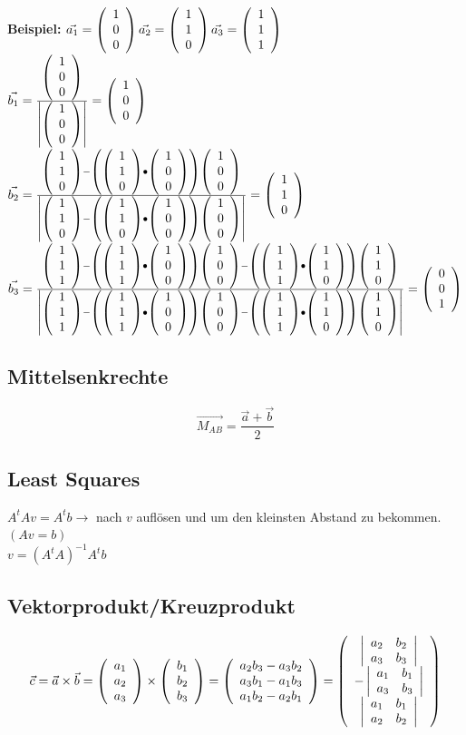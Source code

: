 	\textbf{Beispiel:} $\vec{a_1}=\vektor{1}{0}{0}
						\vec{a_2}=\vektor{1}{1}{0}
						\vec{a_3}=\vektor{1}{1}{1}$ \\
						
						$\vec{b_1}=\frac{\vektor{1}{0}{0}}{\left|\vektor{1}{0}{0}\right|}=\vektor{1}{0}{0}$ \\
						$\vec{b_2}=\frac{\vektor{1}{1}{0}-\left(\vektor{1}{1}{0}\bullet\vektor{1}{0}{0}\right)\vektor{1}{0}{0}}{\left|\vektor{1}{1}{0}-\left(\vektor{1}{1}{0}\bullet\vektor{1}{0}{0}\right)\vektor{1}{0}{0}\right|}=\vektor{1}{1}{0}$\\
						$\vec{b_3}=\frac{\vektor{1}{1}{1}-\left(\vektor{1}{1}{1}\bullet\vektor{1}{0}{0}\right)\vektor{1}{0}{0}-\left(\vektor{1}{1}{1}\bullet\vektor{1}{1}{0}\right)\vektor{1}{1}{0}}{\left|\vektor{1}{1}{1}-\left(\vektor{1}{1}{1}\bullet\vektor{1}{0}{0}\right)\vektor{1}{0}{0}-\left(\vektor{1}{1}{1}\bullet\vektor{1}{1}{0}\right)\vektor{1}{1}{0}\right|}=\vektor{0}{0}{1}$

\subsection{Mittelsenkrechte}
	\begin{equation*}
		\vec{M_{AB}} = \frac{\vec{a} + \vec{b}}{2}
	\end{equation*}

\subsection{Least Squares}
	$A^tAv = A^tb \longrightarrow$ nach $v$ auflösen und um den kleinsten Abstand zu bekommen. \qquad $(Av = b)$ \\
	$v = (A^{t} A)^{-1} A^{t} b$
		
\subsection{Vektorprodukt/Kreuzprodukt}
	\begin{equation*}
		\vec{c} = \vec{a} \times \vec{b} = \vektor{a_1}{a_2}{a_3} \times \vektor{b_1}{b_2}{b_3} = \left(\begin{array}{c}
			a_2b_3 - a_3b_2\\
			a_3b_1 - a_1b_3\\
			a_1b_2 - a_2b_1
		\end{array}\right)
		=\left(\begin{array}{c}
			\left|\begin{array}{cc}
				a_2 & b_2 \\
				a_3 & b_3 \end{array}\right|\\
			-\left|\begin{array}{cc}
				a_1 & b_1 \\
				a_3 & b_3 \end{array}\right|\\
			\left|\begin{array}{cc}
				a_1 & b_1 \\
				a_2 & b_2 \end{array}\right|
		\end{array}\right)
	\end{equation*}

